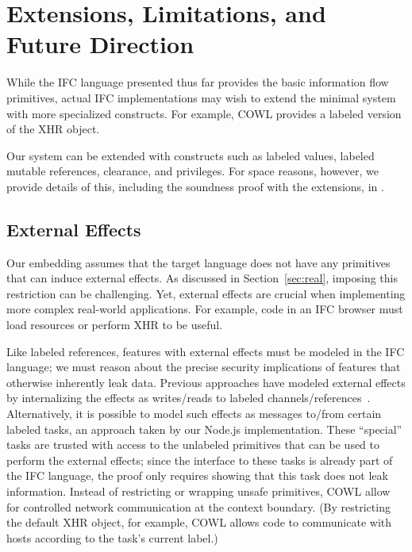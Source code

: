 
\section{Extensions, Limitations, and Future Direction}
\label{sec:extensions}
\label{sec:extensions:labeled}

While the IFC language presented thus far provides the basic
information flow primitives, actual IFC implementations
may wish to extend the minimal system with more specialized
constructs.
For example, COWL provides a labeled version of the XHR object.

Our system can be extended with constructs such as labeled values,
labeled mutable references, clearance, and privileges.
For space reasons, however, we provide
details of this, including the soundness
proof with the extensions, in \appendixextfirst{}.


\subsection{External Effects}
\label{sec:extensions:external}
Our embedding assumes that the target language does not have any
primitives that can induce external effects.
%
As discussed in Section~\ref{sec:real}, imposing this restriction
can be challenging.
%
Yet, external effects are crucial when implementing more complex
real-world applications.
%
For example, code in an IFC browser must load resources or
perform XHR to be useful.

Like labeled references, features with external effects must be
modeled in the IFC language; we must reason about the precise security
implications of features that otherwise inherently leak data.
%
Previous approaches have modeled external effects by internalizing the
effects as writes/reads to labeled channels/references~\cite{stefan:addressing-covert}.
%
Alternatively, it is possible to model such effects as messages to/from
certain labeled tasks, an approach taken by our Node.js
implementation.
%
These ``special'' tasks are trusted with access to the unlabeled
primitives that can be used to perform the external effects; since the
interface to these tasks is already part of the IFC language, the
proof only requires showing that this task does not leak information.
%
Instead of restricting or wrapping unsafe primitives,
COWL allow for
controlled network communication at the context boundary.
%
(By restricting the default XHR object, for example, COWL allows code
to communicate with hosts according to the task's current label.)
